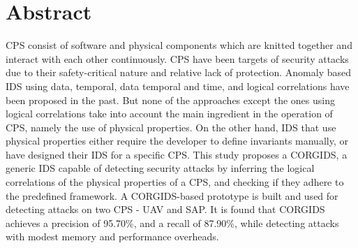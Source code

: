 
\chapter{Abstract}

 \ac{CPS} consist of software and physical components which are knitted together and interact with each other continuously. \ac{CPS} have been targets of security attacks due to their safety-critical nature and relative lack of protection. Anomaly based \ac{IDS} using data, temporal, data temporal and time, and logical correlations have been proposed in the past. But none of the approaches except the ones using logical correlations take into account the main ingredient in the operation of \ac{CPS}, namely the use of physical properties. On the other hand, \ac{IDS} that use physical properties either require the developer to define invariants manually, or have designed their \ac{IDS} for a specific \ac{CPS}. This study proposes a \ac{CORGIDS}, a generic \ac{IDS} capable of detecting security attacks by inferring the logical correlations of the physical properties of a \ac{CPS}, and checking if they adhere to the predefined framework. A \ac{CORGIDS}-based prototype is built and used for detecting attacks on two \ac{CPS} - \ac{UAV} and \ac{SAP}. It is found that \ac{CORGIDS} achieves a precision of  95.70\%, and a recall of 87.90\%, while detecting attacks with modest memory and performance overheads.

